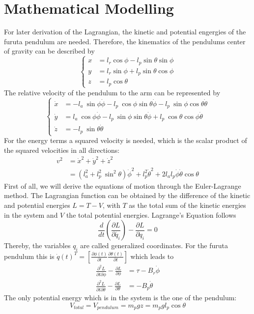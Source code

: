 \section{Mathematical Modelling 
\cite{furuta1992swing,gafvert2016modelling,ozbek2010swing,zhang2011optimal}}
For later derivation of the Lagrangian, the kinetic and potential engergies of 
the furuta pendulum are needed. Therefore, the kinematics of the pendulums 
center of gravity can be described by 
\[\begin{cases}
x&=l_r\cos\phi-l_{p}\sin\theta\sin\phi \\ 
y&=l_r\sin\phi+l_{p}\sin\theta\cos\phi \\ 
z&=l_{p}\cos\theta
\end{cases} \] 
The relative velocity of the pendulum to the arm can be represented by 
\[ \begin{cases}
\dot{x}&=-l_a\ \sin \phi \dot{\phi}-l_{p}\ \cos\phi \sin\theta\dot{\phi}-l_{p} 
\ \sin\phi \cos\theta\dot{\theta} \\ 
\dot{y} &=l_a\ \cos\phi\dot{\phi}-l_{p} \ \sin\phi \sin\theta\dot{\phi}+l_{p} 
\ \cos\theta \cos\phi\dot{\theta} \\
 \dot{z}&=-l_{p} \ \sin\theta\dot{\theta}
\end{cases}\]
For the energy terms a squared velocity is needed, which is the scalar product 
of the squared velocities in all directions:
\begin{align*}v^2&=\dot{x}^2+\dot{y}^2+\dot{z}^2\\
&=(l_a^2+l_p^2\ 
\sin^2\theta)\dot{\phi}^2+l_p^2\dot{\theta}^2+2l_al_p\dot{\phi}\dot{\theta}\cos 
\theta\end{align*} %
First of all, we will derive the equations of motion through the Euler-Lagrange 
method. The Lagrangian function can be obtained by the difference of the 
kinetic and potential energies $L=T-V$, with $T$ as the total sum of the 
kinetic energies in the system and $V$ the total potential energies. Lagrange's 
Equation follows \[ 
\frac{d}{dt}\left(\frac{\partial L}{\partial 
\dot{q_i}}\right)-\frac{\partial 
L}{\partial 
q_i}=0 \] Thereby, the variables $q_i$ are called generalized coordinates. For 
the furuta pendulum this is $\dot{q}(t)^T = \left[\frac{\partial 
\phi(t)}{\partial t} \frac{\partial \theta(t)}{\partial t} \right]$ which leads 
to 
\begin{align*}
	\frac{\partial^2 L}{\partial t\partial \dot{\phi}}-\frac{\partial 
	L}{\partial \phi}&=\tau - B_r\dot{\phi}\\
	\frac{\partial^2 L}{\partial t\partial \dot{\theta}}-\frac{\partial 
	L}{\partial \theta}&=-B_p\dot{\theta}
\end{align*}
The only potential energy which is in the system is the one of the pendulum:
\[V_{total}=V_{pendulum}=m_pgz= m_pgl_{p}\cos\theta\]






